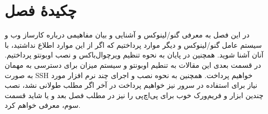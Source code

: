 \section{چکیدهٔ فصل}

در این فصل به معرفی گنو/لینوکس و آشنایی و بیان مفاهیمی درباره کارساز وب و سیستم عامل گنو/لینوکس و دیگر موارد پرداختیم که اگر از این موارد اطلاع نداشتید، با آنان آشنا شوید. همچنین در پایان به نحوه تنظیم ویرچوال‌باکس و نصب اوبونتو پرداختیم. در قسمت بعدی این مقالات به تنطیم اوبونتو و سیستم میزان برای دسترسی به مهمان به صورت  \lr{}SSH خواهیم پرداخت. همچنین به نحوه نصب و اجرای چند نرم افزار مورد نیاز برای استفاده در سرور نیز خواهیم پرداخت در آخر اگر مطلب طولانی نشد، نصب چندین ابزار و فریم‌ورک خوب برای پی‌اچ‌پی را  نیز در مطلب  فصل بعد و یا شاید قسمت سوم، معرفی خواهم کرد.

